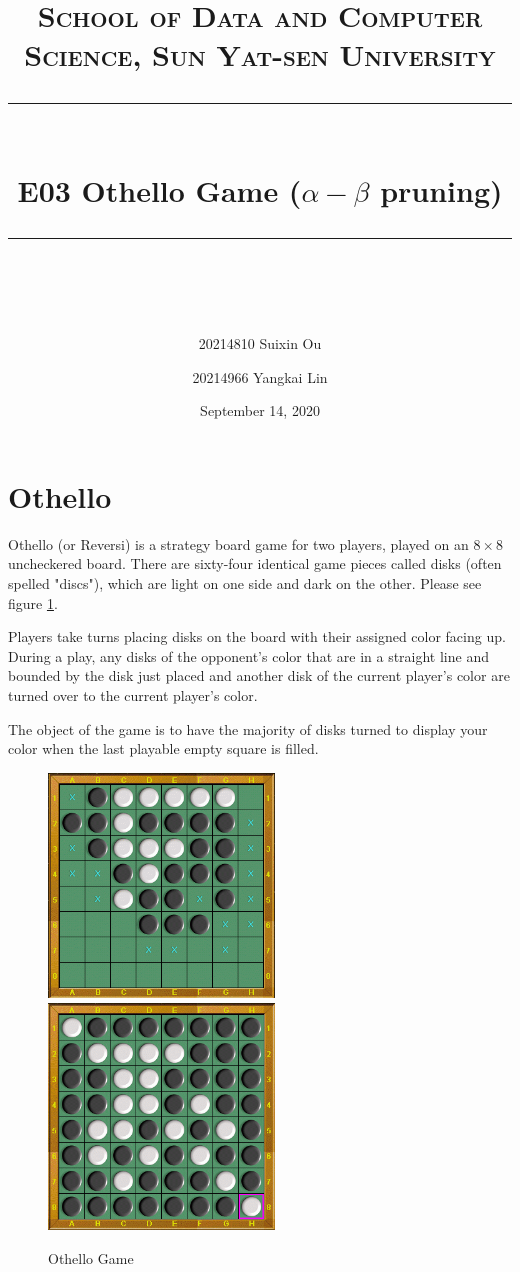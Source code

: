 ﻿\documentclass[a4paper, 11pt]{article}
\title{	
\normalfont \normalsize
\textsc{School of Data and Computer Science, Sun Yat-sen University} \\ [25pt] %
\rule{\textwidth}{0.5pt} \\[0.4cm] %
\huge  E03 Othello Game ($\alpha-\beta$ pruning) \\ %
\rule{\textwidth}{2pt} \\[0.5cm] %
\author{20214810 Suixin Ou\and20214966 Yangkai Lin}
\date{\normalsize September 14, 2020} 
}
\begin{document}
\maketitle
\tableofcontents
\newpage

\section{Othello}
Othello (or Reversi) is a strategy board game for two players, played on an $8 \times 8$ uncheckered board. There are sixty-four identical game pieces called disks (often spelled "discs"), which are light on one side and dark on the other. Please see figure \ref{fig:othello}.

Players take turns placing disks on the board with their assigned color facing up. During a play, any disks of the opponent's color that are in a straight line and bounded by the disk just placed and another disk of the current player's color are turned over to the current player's color.

The object of the game is to have the majority of disks turned to display your color when the last playable empty square is filled.
\begin{figure}
  \centering
  \includegraphics[width=6cm]{Pic/othello}
  \qquad
  \includegraphics[width=6cm]{Pic/othello2}
  \caption{Othello Game}
  \label{fig:othello}
\end{figure}
\end{document}
